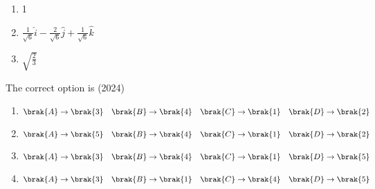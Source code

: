 \begin{enumerate}[label=\thesubsection.\arabic*.,ref=\thesubsection.\theenumi]
\begin{multicols}{2}
\begin{enumerate}[label=(\arabic*)]
\item  1 
\item  $\frac{1}{\sqrt{6}}\hat{i}-\frac{2}{\sqrt{6}}\hat{j}+\frac{1}{\sqrt{6}}\hat{k}$ 
\item  $\sqrt{\frac{2}{3}}$
\end{enumerate}
\end{multicols}
The correct option is
\hfill (2024)
\begin{enumerate}
\item $ \brak{A} \rightarrow \brak{3} \quad \brak{B} \rightarrow \brak{4} \quad \brak{C} \rightarrow \brak{1} \quad \brak{D} \rightarrow \brak{2} $
\item $ \brak{A} \rightarrow \brak{5} \quad \brak{B} \rightarrow \brak{4} \quad \brak{C} \rightarrow \brak{1} \quad \brak{D} \rightarrow \brak{2} $
\item $ \brak{A} \rightarrow \brak{3} \quad \brak{B} \rightarrow \brak{4} \quad \brak{C} \rightarrow \brak{1} \quad \brak{D} \rightarrow \brak{5} $
\item $ \brak{A} \rightarrow \brak{3} \quad \brak{B} \rightarrow \brak{1} \quad \brak{C} \rightarrow \brak{4} \quad \brak{D} \rightarrow \brak{5} $
\end{enumerate}
\end{enumerate}
